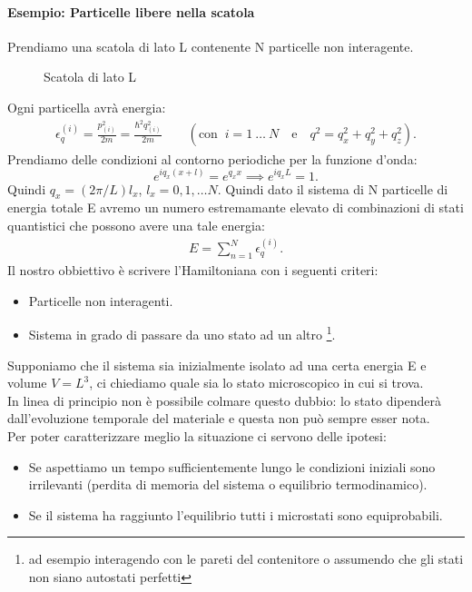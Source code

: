 \paragraph{Esempio: Particelle libere nella scatola}%
Prendiamo una scatola di lato L contenente N particelle non interagente. 
\begin{figure}[H]
    \centering
    \caption{Scatola di lato L}
    \label{fig:scatola-l3}
\end{figure}
Ogni particella avrà energia:
\begin{align}
	\epsilon^{\left(i\right)}_{q}=\frac{p_{\left(i\right)}^2}{2m}=\frac{\hbar^2q_{\left(i\right)}^2}{2m}\quad\quad\left(\text{con } \ i = 1 \ \ldots \ N
	\quad \text{e}\quad q^2 = q^2_{x}+ q^2_{y}+q^2_{z} \right)
 .\end{align}
Prendiamo delle condizioni al contorno periodiche per la funzione d'onda:
\[
	 e^{iq_{x}\left( x+l \right) } = e^{q_{x}x} \implies e^{iq_{x}L} = 1
.\] 
Quindi $q_{x} = \left( 2\pi / L \right) l_{x}$, $l_{x} = 0, 1, \ldots N$. Quindi dato il sistema di N particelle di energia totale E avremo un numero estremamante elevato di combinazioni di stati quantistici che possono avere una tale energia:
\begin{align}
	E = \sum_{n=1}^{N} \epsilon_{q}^{\left(i\right)}
.\end{align}
Il nostro obbiettivo è scrivere l'Hamiltoniana con i seguenti criteri:
\begin{itemize}
	\item Particelle non interagenti.
	\item Sistema in grado di passare da uno stato ad un altro \footnote{ad esempio interagendo con le pareti del contenitore o assumendo che gli stati non siano autostati perfetti}.
\end{itemize}
Supponiamo che il sistema sia inizialmente isolato ad una certa energia E e volume $V=L^3$, ci chiediamo quale sia lo stato microscopico in cui si trova.\\
In linea di principio non è possibile colmare questo dubbio: lo stato dipenderà dall'evoluzione temporale del materiale e questa non può sempre esser nota.\\
Per poter caratterizzare meglio la situazione ci servono delle ipotesi:
\begin{itemize}
	\item Se aspettiamo un tempo sufficientemente lungo le condizioni iniziali sono irrilevanti (perdita di memoria del sistema o equilibrio termodinamico).
	\item Se il sistema ha raggiunto l'equilibrio tutti i microstati sono equiprobabili.
\end{itemize}
